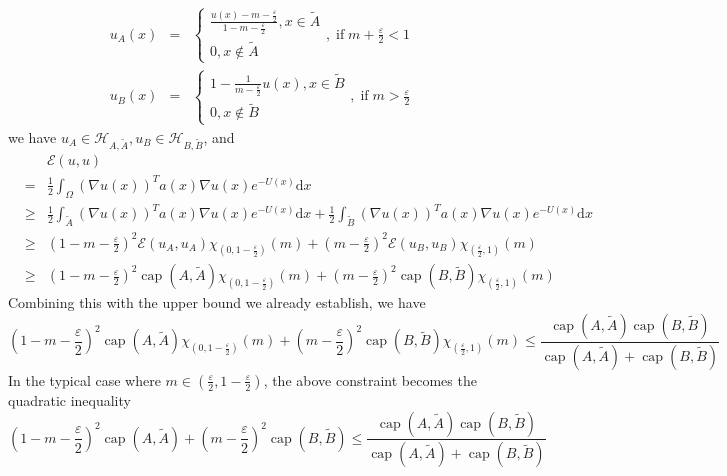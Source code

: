 \documentclass[english, aip, jcp, priprint, graphicx]{revtex4-1}
\newcommand{\mathd}{\mathrm{d}}
\newcommand{\nin}{\not\in}
\newcommand{\tmop}[1]{\ensuremath{\operatorname{#1}}}
\theoremstyle{plain}
\theoremstyle{definition}
\theoremstyle{plain}
\begin{document}
\begin{eqnarray*}
u_A (x) & = & \left\{ \begin{array}{l}
\frac{u (x) - m - \frac{\varepsilon}{2}}{1 - m - \frac{\varepsilon}{2}}, x
\in \tilde{A}\\
0, x \nin \tilde{A}
\end{array} \right., \tmop{if} m + \frac{\varepsilon}{2} < 1\\
u_B (x) & = & \left\{ \begin{array}{l}
1 - \frac{1}{m - \frac{\varepsilon}{2}} u (x), x \in \tilde{B}\\
0, x \nin \tilde{B}
\end{array} \right., \tmop{if} m > \frac{\varepsilon}{2}
\end{eqnarray*}
we have $u_A \in \mathcal{H}_{A, \tilde{A}}, u_B \in \mathcal{H}_{B,
\tilde{B}}$, and
\begin{eqnarray*}
&  & \mathcal{E} (u, u)\\
& = & \frac{1}{2} \int_{\Omega} (\nabla u (x))^T a (x) \nabla u (x)
e^{- U (x)} \mathd x\\
& \geqslant & \frac{1}{2} \int_{\tilde{A}} (\nabla u (x))^T a (x) \nabla u
(x) e^{- U (x)} \mathd x + \frac{1}{2} \int_{\tilde{B}} (\nabla u (x))^T a
(x) \nabla u (x) e^{- U (x)} \mathd x\\
& \geqslant & \left( 1 - m - \frac{\varepsilon}{2} \right)^2 \mathcal{E}
(u_A, u_A) \chi_{\left( 0, 1 - \frac{\varepsilon}{2} \right)} (m) + \left( m
- \frac{\varepsilon}{2} \right)^2 \mathcal{E} (u_B, u_B) \chi_{\left(
\frac{\varepsilon}{2}, 1 \right)} (m)\\
& \geqslant & \left( 1 - m - \frac{\varepsilon}{2} \right)^2 \tmop{cap} (A,
\tilde{A}) \chi_{\left( 0, 1 - \frac{\varepsilon}{2} \right)} (m) + \left( m
- \frac{\varepsilon}{2} \right)^2 \tmop{cap} (B, \tilde{B}) \chi_{\left(
\frac{\varepsilon}{2}, 1 \right)} (m)
\end{eqnarray*}
Combining this with the upper bound we already establish, we have
\[ \left( 1 - m - \frac{\varepsilon}{2} \right)^2 \tmop{cap} (A, \tilde{A})
\chi_{\left( 0, 1 - \frac{\varepsilon}{2} \right)} (m) + \left( m -
\frac{\varepsilon}{2} \right)^2 \tmop{cap} (B, \tilde{B}) \chi_{\left(
\frac{\varepsilon}{2}, 1 \right)} (m) \leqslant \frac{\tmop{cap} (A,
\tilde{A}) \tmop{cap} (B, \tilde{B})}{\tmop{cap} (A, \tilde{A}) +
\tmop{cap} (B, \tilde{B})} \]
In the typical case where $m \in \left( \frac{\varepsilon}{2}, 1 - \frac{\varepsilon}{2} \right)$, the above constraint becomes the quadratic inequality
\[ \left( 1 - m - \frac{\varepsilon}{2} \right)^2 \tmop{cap} (A, \tilde{A}) +
\left( m - \frac{\varepsilon}{2} \right)^2 \tmop{cap} (B, \tilde{B})
\leqslant \frac{\tmop{cap} (A, \tilde{A}) \tmop{cap} (B,
\tilde{B})}{\tmop{cap} (A, \tilde{A}) + \tmop{cap} (B, \tilde{B})} \]
\end{document}
